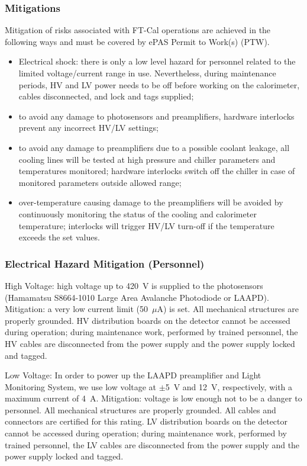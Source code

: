 \subsubsection{Mitigations}

Mitigation of risks associated with FT-Cal operations are achieved in the following ways and
must be covered by ePAS Permit to Work(s) (PTW).

\begin{itemize}
\item {Electrical shock: there is only a low level hazard for personnel related to the limited 
voltage/current range in use. Nevertheless, during maintenance periods,  HV and LV  power needs 
to be off before working on the calorimeter, cables disconnected, and lock and tags supplied;}
\item  {to avoid any damage to photosensors and preamplifiers, hardware  interlocks prevent 
any incorrect HV/LV settings; }
\item  {to avoid any damage to preamplifiers due to a possible coolant leakage, all cooling 
lines will be tested at high pressure and chiller parameters and temperatures monitored; 
hardware interlocks switch off the chiller in case of monitored parameters outside 
allowed range; }
\item {over-temperature causing damage to the preamplifiers will be avoided by continuously 
monitoring the status of the cooling and calorimeter temperature; interlocks will trigger HV/LV 
turn-off if the temperature exceeds the set values.}
\end{itemize}

\subsubsection{Electrical Hazard Mitigation (Personnel)}

High Voltage: high voltage up to 420~V is supplied to the photosensors (Hamamatsu S8664-1010 
Large Area Avalanche Photodiode or LAAPD). Mitigation: a very low current limit (50~$\mu$A) is 
set. All mechanical structures are properly grounded. HV distribution boards on the detector 
cannot be accessed during operation; during maintenance work, performed by trained personnel, 
the HV cables are disconnected from the power supply and the power supply locked and tagged.

Low Voltage: In order to power up the LAAPD preamplifier and Light Monitoring System, we use 
low voltage at $\pm$5~V and 12~V, respectively, with a maximum current of 4~A. Mitigation: 
voltage is low enough not to be a danger to personnel. All mechanical structures are properly 
grounded. All cables and connectors are certified for this rating. LV distribution boards on 
the detector cannot be accessed during operation; during maintenance work, performed by trained 
personnel, the LV cables are disconnected from the power supply and the power supply locked and 
tagged.

